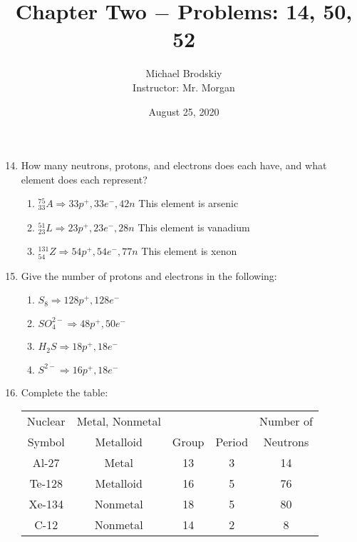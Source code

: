 \documentclass[12pt]{article}
\title{Chapter Two $-$ Problems: 14, 50, 52}
\date{August 25, 2020}
\author{Michael Brodskiy\\ \small Instructor: Mr. Morgan}
\begin{document}
\maketitle

\begin{enumerate}
    \setcounter{enumi}{13}

  \item How many neutrons, protons, and electrons does each have, and what element does each represent?

    \begin{enumerate}

      \item $^{75}_{33}A\Rightarrow 33p^+, 33e^-, 42n$ This element is arsenic

      \item $^{51}_{23}L\Rightarrow 23p^+, 23e^-, 28n$ This element is vanadium

      \item $^{131}_{54}Z\Rightarrow 54p^+, 54e^-, 77n$ This element is xenon

    \end{enumerate}

    \setcounter{enumi}{49}

  \item Give the number of protons and electrons in the following:

    \begin{enumerate}

    \item $S_8\Rightarrow 128p^+, 128e^-$

    \item $SO_4^{2-}\Rightarrow 48p^+, 50e^-$

    \item $H_2S \Rightarrow 18p^+, 18e^-$

    \item $S^{2-}\Rightarrow 16p^+, 18e^-$

    \end{enumerate}

    \setcounter{enumi}{51}

  \item Complete the table:


    \begin{center}

      \begin{tabular}{|c|c|c|c|c|}
\hline
Nuclear & Metal, Nonmetal & & & Number of \\
Symbol & Metalloid & Group & Period & Neutrons\\
\hline
Al-27 & Metal & 13 & 3 & 14 \\
\hline
Te-128 & Metalloid & 16 & 5 & 76 \\
\hline
Xe-134 & Nonmetal & 18 & 5 & 80 \\ 
\hline
C-12 & Nonmetal & 14 & 2 & 8 \\
\hline

      \end{tabular}

    \end{center}

\end{enumerate}
\end{document}
